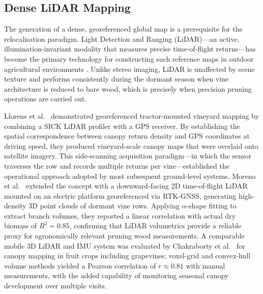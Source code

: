 \subsection{Dense LiDAR Mapping}
\label{subsec:dense-lidar-mapping}

The generation of a dense, georeferenced global map is a prerequisite for the relocalisation paradigm. Light Detection and Ranging (LiDAR)---an active, illumination-invariant modality that measures precise time-of-flight returns---has become the primary technology for constructing such reference maps in outdoor agricultural environments \cite{farhanComprehensiveReviewLiDAR2024}. Unlike stereo imaging, LiDAR is unaffected by scene texture and performs consistently during the dormant season when vine architecture is reduced to bare wood, which is precisely when precision pruning operations are carried out.

Llorens et al.~\cite{llorensGeoreferencedLiDAR3D2011} demonstrated georeferenced tractor-mounted vineyard mapping by combining a SICK LiDAR profiler with a GPS receiver. By establishing the spatial correspondence between canopy return density and GPS coordinates at driving speed, they produced vineyard-scale canopy maps that were overlaid onto satellite imagery. This side-scanning acquisition paradigm---in which the sensor traverses the row and records multiple returns per vine---established the operational approach adopted by most subsequent ground-level systems. Moreno et al.~\cite{morenoOnGroundVineyardReconstruction2020} extended the concept with a downward-facing 2D time-of-flight LiDAR mounted on an electric platform georeferenced via RTK-GNSS, generating high-density 3D point clouds of dormant vine rows. Applying $\alpha$-shape fitting to extract branch volumes, they reported a linear correlation with actual dry biomass of $R^2 = 0.85$, confirming that LiDAR volumetrics provide a reliable proxy for agronomically relevant pruning wood measurements. A comparable mobile 3D LiDAR and IMU system was evaluated by Chakraborty et al.~\cite{chakrabortyEvaluationMobile3D2019} for canopy mapping in fruit crops including grapevines; voxel-grid and convex-hull volume methods yielded a Pearson correlation of $r \approx 0.81$ with manual measurements, with the added capability of monitoring seasonal canopy development over multiple visits.

